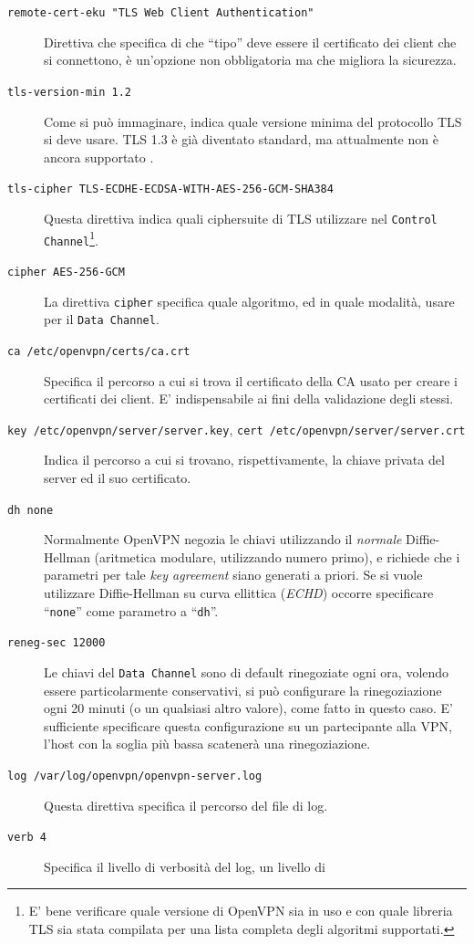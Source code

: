 \begin{description}
	\item[\texttt{remote-cert-eku "TLS Web Client Authentication"}]Direttiva che specifica
	di che ``tipo'' deve essere il certificato dei client che si connettono, è un'opzione
	non obbligatoria ma che migliora la sicurezza.
	\item[\texttt{tls-version-min 1.2}]Come si può immaginare, indica quale versione minima
	del protocollo TLS si deve usare. TLS 1.3 è già diventato standard, ma attualmente
	non è ancora supportato \cite{RFC8446}.
	\item[\texttt{tls-cipher TLS-ECDHE-ECDSA-WITH-AES-256-GCM-SHA384}]Questa direttiva
	indica quali ciphersuite di TLS utilizzare nel \texttt{Control Channel}\footnote{E' bene
		verificare quale versione di OpenVPN sia in uso e con quale libreria TLS sia
		stata compilata per una lista completa degli algoritmi supportati.}.
	\item[\texttt{cipher AES-256-GCM}]La direttiva \texttt{cipher} specifica
	quale algoritmo, ed in quale modalità, usare per il \texttt{Data Channel}.
	\item[\texttt{ca /etc/openvpn/certs/ca.crt}]Specifica il percorso a cui si trova
	il certificato della CA usato per creare i certificati dei client. E' indispensabile
	ai fini della validazione degli stessi.
	\item[\texttt{key /etc/openvpn/server/server.key}, \texttt{cert /etc/openvpn/server/server.crt}]
	Indica il percorso a cui si trovano,
	rispettivamente, la chiave privata del server ed il suo certificato.
	\item[\texttt{dh none}]Normalmente OpenVPN negozia le chiavi utilizzando il \textit{normale}
	Diffie-Hellman (aritmetica modulare, utilizzando numero primo), e richiede che i parametri
	per tale \textit{key agreement} siano generati a priori. Se si vuole utilizzare
	Diffie-Hellman su curva ellittica (\textit{ECHD}) occorre specificare ``\texttt{none}''
	come parametro a ``\texttt{dh}''.
	\item[\texttt{reneg-sec 12000}]Le chiavi del \texttt{Data Channel} sono di default rinegoziate
	ogni ora, volendo essere particolarmente conservativi, si può configurare
	la rinegoziazione ogni 20 minuti (o un qualsiasi altro valore), come fatto in
	questo caso. E' sufficiente specificare questa configurazione su un partecipante
	alla VPN, l'host con la soglia più bassa scatenerà una rinegoziazione.
	\item[\texttt{log /var/log/openvpn/openvpn-server.log}]Questa direttiva specifica
	il percorso del file di log.
	\item[\texttt{verb 4}]Specifica il livello di verbosità del log, un livello di

\end{description}
